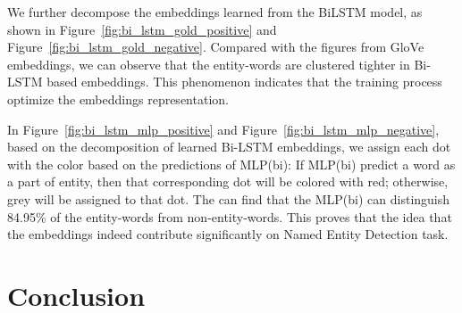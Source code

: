 \documentclass{article}
\begin{document}
We further decompose the embeddings learned from the BiLSTM model, as shown in Figure~\ref{fig:bi_lstm_gold_positive} and Figure~\ref{fig:bi_lstm_gold_negative}. Compared with the figures from GloVe embeddings, we can observe that the entity-words are clustered tighter in Bi-LSTM based embeddings. This phenomenon indicates that the training process optimize the embeddings representation.

In Figure~\ref{fig:bi_lstm_mlp_positive} and Figure~\ref{fig:bi_lstm_mlp_negative}, based on the decomposition of learned Bi-LSTM embeddings, we assign each dot with the color based on the predictions of MLP(bi): If MLP(bi) predict a word as a part of entity, then that corresponding dot will be colored with red; otherwise, grey will be assigned to that dot. The can find that the MLP(bi) can distinguish 84.95\% of the entity-words from non-entity-words. This proves that the idea that the embeddings indeed contribute significantly on Named Entity Detection task.


\section{Conclusion}


\nocite{*}




\end{document}
